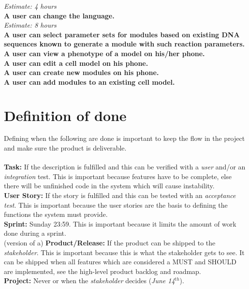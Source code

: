 \documentclass[10pt,a4paper]{report}
\begin{document}
		\indent
			\emph{Estimate: 4 hours} \\
		\textbf{A user can change the language.} \\
		\indent
			\emph{Estimate: 8 hours} \\
		\textbf{A user can select parameter sets for modules based on existing DNA sequences known to generate a module with such reaction parameters.} \\
		\textbf{A user can view a phenotype of a model on his/her phone.} \\
		\textbf{A user can edit a cell model on his phone.} \\
		\textbf{A user can create new modules on his phone.} \\
		\textbf{A user can add modules to an existing cell model.} \\

	\clearpage
	\section{Definition of done}
		Defining when the following are done is important to keep the flow in the project and make sure the product is deliverable. \\
		\\
		\textbf{Task:} If the description is fulfilled and this can be verified with a \emph{user} and/or an \emph{integration} test. This is important because features have to be complete, else there will be unfinished code in the system which will cause instability.\\
		\newline
		\textbf{User Story:} If the story is fulfilled and this can be tested with an \emph{acceptance test}.  This is important because the user stories are the basis to defining the functions the system must provide.\\
		\newline
		\textbf{Sprint:} Sunday 23:59. This is important because it limits the amount of work done during a sprint.\\
		\newline
		(version of a) \textbf{Product/Release:} If the product can be shipped to the \emph{stakeholder}. This is important because this is what the stakeholder gets to see. It can be shipped when all features which are considered a MUST and SHOULD are implemented, see the high-level product backlog and roadmap. \\
		\newline
		\textbf{Project:} Never or when the \emph{stakeholder} decides (\emph{June 14$^{th}$}).
\end{document}

